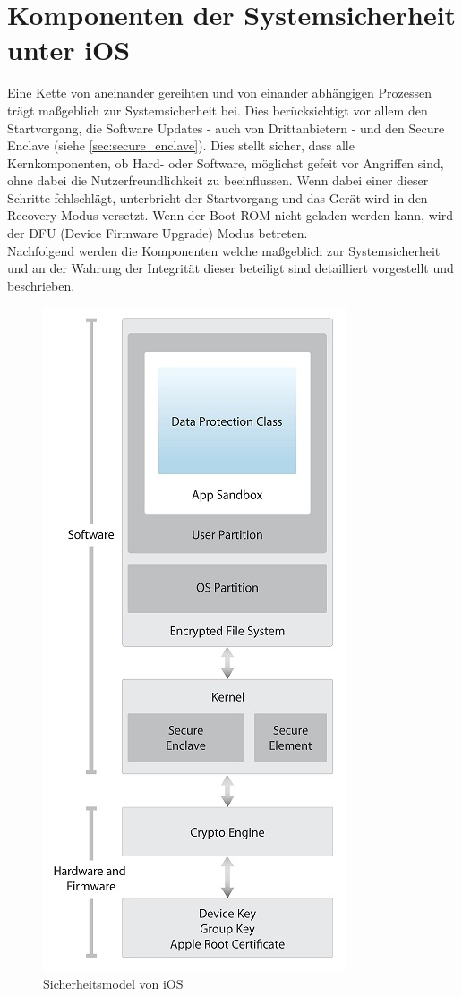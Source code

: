 \section{Komponenten der Systemsicherheit unter
iOS}\label{sec:components-syssec} Eine Kette von aneinander gereihten und
von einander abhängigen Prozessen trägt maßgeblich zur Systemsicherheit bei. Dies berücksichtigt vor allem den
	Startvorgang, die Software Updates - auch von Drittanbietern - und den Secure
	Enclave (siehe \ref{sec:secure_enclave}). Dies stellt sicher, dass alle
	Kernkomponenten, ob Hard- oder Software, möglichst gefeit vor Angriffen sind, ohne dabei die
	Nutzerfreundlichkeit zu beeinflussen. Wenn dabei einer dieser Schritte
	fehlschlägt, unterbricht der Startvorgang und das Gerät wird in den
	Recovery Modus versetzt. Wenn der Boot-ROM nicht geladen werden kann, wird der DFU (Device
	Firmware Upgrade) Modus betreten.\\ 
	Nachfolgend werden die Komponenten welche maßgeblich zur Systemsicherheit und
	an der Wahrung der Integrität dieser beteiligt sind	detailliert vorgestellt und beschrieben.
	
	\begin{figure}[h]
		\centering
		\includegraphics[width=0.4\linewidth]{ios/media/security-model.jpg}
		\caption{Sicherheitsmodel von iOS \cite{iOSSecurityApr2015}}
		\label{fig:security-model}
	\end{figure}

